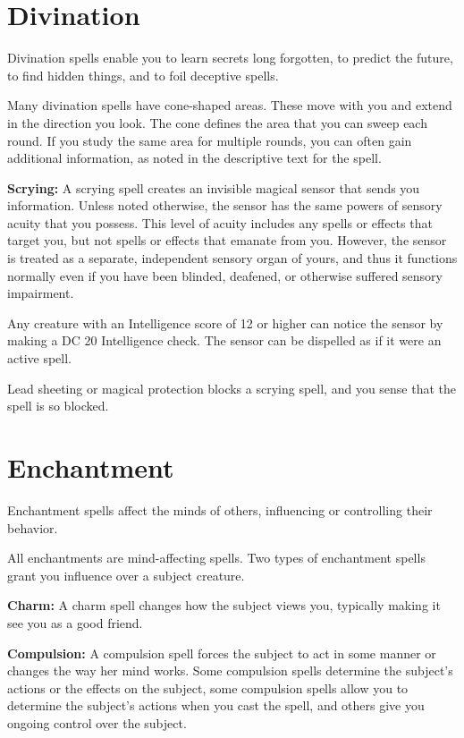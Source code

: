 \documentclass{article}
\begin{document}
\vspace{12pt}
\section*{\textbf{Divination}}

Divination spells enable you to learn secrets long forgotten, to predict the future, 
to find hidden things, and to foil deceptive spells.

Many divination spells have cone-shaped areas. These move with you and extend in 
the direction you look. The cone defines the area that you can sweep each round. 
If you study the same area for multiple rounds, you can often gain additional information, 
as noted in the descriptive text for the spell.

\textbf{Scrying:} A scrying spell creates an invisible magical sensor that sends 
you information. Unless noted otherwise, the sensor has the same powers of sensory 
acuity that you possess. This level of acuity includes any spells or effects that 
target you, but not spells or effects that emanate from you. However, the sensor 
is treated as a separate, independent sensory organ of yours, and thus it functions 
normally even if you have been blinded, deafened, or otherwise suffered sensory 
impairment.

Any creature with an Intelligence score of 12 or higher can notice the sensor by 
making a DC 20 Intelligence check. The sensor can be dispelled as if it were an 
active spell.

Lead sheeting or magical protection blocks a scrying spell, and you sense that 
the spell is so blocked.

\vspace{12pt}
\section*{\textbf{Enchantment}}

Enchantment spells affect the minds of others, influencing or controlling their 
behavior.

All enchantments are mind-affecting spells. Two types of enchantment spells grant 
you influence over a subject creature.

\textbf{Charm:} A charm spell changes how the subject views you, typically making 
it see you as a good friend.

\textbf{Compulsion:} A compulsion spell forces the subject to act in some manner 
or changes the way her mind works. Some compulsion spells determine the subject's 
actions or the effects on the subject, some compulsion spells allow you to determine 
the subject's actions when you cast the spell, and others give you ongoing control 
over the subject.
\end{document}
